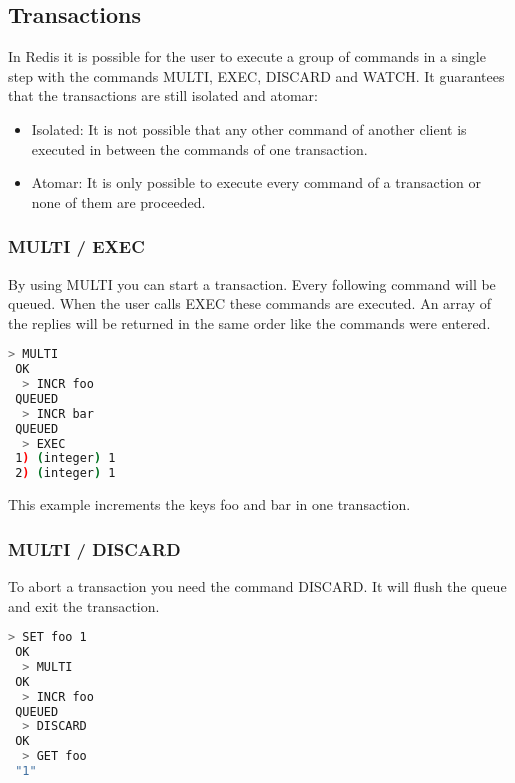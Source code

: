 \subsection{Transactions}
In Redis it is possible for the user to execute a group of commands in a single step with the commands MULTI, EXEC, DISCARD and WATCH. It guarantees that the transactions are still isolated and atomar:

\begin{itemize}
  \item Isolated: It is not possible that any other command of another client is executed in between the commands of one transaction.
  \item Atomar: It is only possible to execute every command of a transaction or none of them are proceeded.
\end{itemize}


\subsubsection{MULTI / EXEC}

By using MULTI you can start a transaction. Every following command will be queued. When the user calls EXEC these commands are executed. An array of the replies will be returned in the same order like the commands were entered.

\begin{lstlisting}[language=bash]
  > MULTI
 OK
  > INCR foo
 QUEUED
  > INCR bar
 QUEUED
  > EXEC
 1) (integer) 1
 2) (integer) 1
\end{lstlisting}

This example increments the keys foo and bar in one transaction.

\subsubsection{MULTI / DISCARD}
To abort a transaction you need the command DISCARD. It will flush the queue and exit the transaction.

\begin{lstlisting}[language=bash]
  > SET foo 1
 OK
  > MULTI
 OK
  > INCR foo
 QUEUED
  > DISCARD
 OK
  > GET foo
 "1"
\end{lstlisting}





